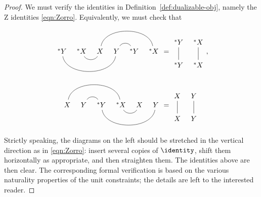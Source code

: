 \begin{proof}
	We must verify the identities in
	Definition~\ref{def:dualizable-obj}, namely the Z identities
	\eqref{eqn:Zorro}. Equivalently, we must check that
	\begin{align*}
		\begin{tikzcd}[column sep=tiny, ampersand replacement=\&]
			{}^* Y \arrow[dash, rrr, bend right=80] \& {}^* X \arrow[dash, r, bend right=60] \& X \arrow[dash, rrr, bend left=80] \& Y \arrow[dash, r, bend left=60] \& {}^* Y \& {}^* X
		\end{tikzcd} & = \begin{tikzcd}[column sep=tiny, ampersand replacement=\&]
			{}^* Y \arrow[dash, d] \& {}^* X \arrow[dash, d] \\
			{}^* Y \& {}^* X 
		\end{tikzcd}, \\
		\begin{tikzcd}[column sep=tiny, ampersand replacement=\&]
			X \arrow[dash, rrr, bend left=80] \& Y \arrow[dash, r, bend left=60] \& {}^* Y \arrow[dash, rrr, bend right=80] \& {}^* X \arrow[dash, r, bend right=60] \& X \& Y
		\end{tikzcd} & = \begin{tikzcd}[column sep=tiny, ampersand replacement=\&]
			X \arrow[dash, d] \& Y \arrow[dash, d] \\
			X \& Y 
		\end{tikzcd}
	\end{align*}
	Strictly speaking, the diagrams on the left should be stretched in the
	vertical direction as in \eqref{eqn:Zorro}: insert several copies of
	$\identity$, shift them horizontally as appropriate, and then straighten
	them. The identities above are then clear. The corresponding formal
	verification is based on the various naturality properties of the unit
	constraints; the details are left to the interested reader.
\end{proof}

